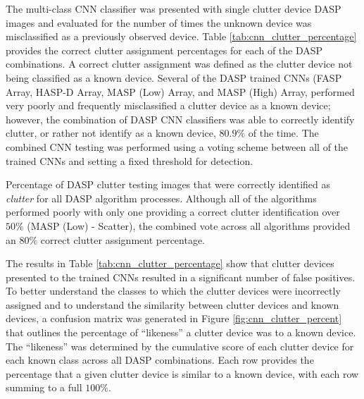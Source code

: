 The multi-class CNN classifier was presented with single clutter device DASP images and evaluated for the number of times the unknown device was misclassified as a previously observed device.  Table \ref{tab:cnn_clutter_percentage} provides the correct clutter assignment percentages for each of the DASP combinations.  A correct clutter assignment was defined as the clutter device not being classified as a known device.  Several of the DASP trained CNNs (FASP Array, HASP-D Array, MASP (Low) Array, and MASP (High) Array, performed very poorly and frequently misclassified a clutter device as a known device; however, the combination of DASP CNN classifiers was able to correctly identify clutter, or rather not identify as a known device, $80.9\%$ of the time.  The combined CNN testing was performed using a voting scheme between all of the trained CNNs and setting a fixed threshold for detection.   

\begin{table}[tb]
	\caption{Percentage of DASP clutter testing images that were correctly identified as \textit{clutter} for all DASP algorithm processes.   Although all of the algorithms performed poorly with only one providing a correct clutter identification over $50\%$ (MASP (Low) - Scatter), the combined vote across all algorithms provided an $80\%$ correct clutter assignment percentage.}
	\centering
	\label{tab:cnn_clutter_percentage}
\end{table}

The results in Table \ref{tab:cnn_clutter_percentage} show that clutter devices presented to the trained CNNs resulted in a significant number of false positives.  To better understand the classes to which the clutter devices were incorrectly assigned and to understand the similarity between clutter devices and known devices, a confusion matrix was generated in Figure \ref{fig:cnn_clutter_percent} that outlines the percentage of ``likeness'' a clutter device was to a known device.   The ``likeness'' was determined by the cumulative score of each clutter device for each known class across all DASP combinations.  Each row provides the percentage that a given clutter device is similar to a known device, with each row summing to a full $100\%$. 

